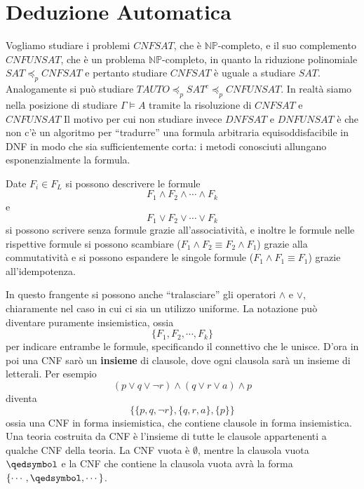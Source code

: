 \section{Deduzione Automatica}
Vogliamo studiare i problemi $CNFSAT$, che è $\mathbb{NP}$-completo, e 
il suo complemento $CNFUNSAT$, che è un problema $\mathbb{NP}$-completo, 
in quanto la riduzione polinomiale $SAT \preceq_p CNFSAT$ e pertanto 
studiare $CNFSAT$ è uguale a studiare $SAT$. Analogamente si può studiare 
$TAUTO \preceq_p SAT^c \preceq_p CNFUNSAT$. In realtà siamo nella posizione 
di studiare $\Gamma \models A$ tramite la risoluzione di $CNFSAT$ e $CNFUNSAT$
Il motivo per cui non studiare invece $DNFSAT$ e $DNFUNSAT$ è che non 
c'è un algoritmo per ``tradurre'' una formula arbitraria equisoddisfacibile 
in DNF in modo che sia sufficientemente corta: i metodi conosciuti allungano
esponenzialmente la formula. 

\begin{defi}
        Date $F_i \in F_L$ si possono descrivere le formule 
        $$
        F_1 \land F_2 \land \cdots \land F_k
        $$
        e 
        $$
        F_1 \lor F_2 \lor \cdots \lor F_k
        $$
        si possono scrivere senza formule grazie all'associatività, 
        e inoltre le formule nelle rispettive formule si possono 
        scambiare ($F_1 \land F_2 \equiv F_2 \land F_1$) grazie 
        alla commutatività e si possono espandere le singole formule 
        ($F_1 \land F_1  \equiv F_1$) grazie all'idempotenza. 

        In questo frangente si possono anche ``tralasciare'' gli operatori 
        $\land$ e $\lor$, chiaramente nel caso in cui ci sia un utilizzo uniforme. 
        La notazione può diventare puramente insiemistica, ossia 
        $$
        \{F_1, F_2, \cdots, F_k\}
        $$
        per indicare entrambe le formule, specificando il connettivo che le 
        unisce. D'ora in poi una CNF sarò un \textbf{insieme} di clausole, 
        dove ogni clausola sarà un insieme di letterali. 
        Per esempio 
        $$
        (p \lor q \lor \neg r) \land (q \lor r \lor a) \land p
        $$
        diventa 
        $$
        \{ \{p, q, \neg r\}, \{q, r, a\}, \{p\}\}
        $$
        ossia una CNF in forma insiemistica, che contiene clausole in 
        forma insiemistica. 
        Una teoria costruita da CNF è l'insieme di tutte le clausole appartenenti 
        a qualche CNF della teoria. 
        La CNF vuota è $\emptyset$, mentre la clausola vuota $\qedsymbol$ 
        e la CNF che contiene la clausola vuota avrà la forma 
        $\{\cdots, \qedsymbol, \cdots \}$.
\end{defi}

